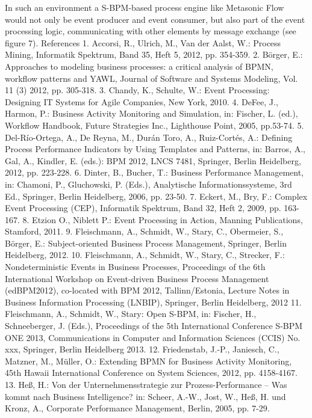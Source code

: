 In such an environment a S-BPM-based process engine like Metasonic Flow would not only be event producer and event consumer, but also part of the event processing logic, communicating with other elements by message exchange (see figure 7).
References
1.	Accorsi, R., Ulrich, M., Van der Aalst, W.: Process Mining, Informatik Spektrum, Band 35, Heft 5, 2012, pp. 354-359.
2.	Börger, E.: Approaches to modeling business processes: a critical analysis of BPMN, workflow patterns and YAWL, Journal of Software and Systems Modeling, Vol. 11 (3) 2012, pp. 305-318.
3.	Chandy, K., Schulte, W.: Event Processing: Designing IT Systems for Agile Companies, New York, 2010.
4.	DeFee, J., Harmon, P.: Business Activity Monitoring and Simulation, in: Fischer, L. (ed.), Workflow Handbook, Future Strategies Inc., Lighthouse Point, 2005, pp.53-74.
5.	Del-Río-Ortega, A., De Reyna, M., Durán Toro, A., Ruiz-Cortés, A.: Defining Process Performance Indicators by Using Templates and Patterns, in: Barros, A., Gal, A., Kindler, E. (eds.): BPM 2012, LNCS 7481, Springer, Berlin Heidelberg, 2012, pp. 223-228.
6.	Dinter, B., Bucher, T.: Business Performance Management, in: Chamoni, P., Gluchowski, P. (Eds.), Analytische Informationssysteme, 3rd Ed., Springer, Berlin Heidelberg, 2006, pp. 23-50.
7.	Eckert, M., Bry, F.: Complex Event Processing (CEP), Informatik Spektrum, Band 32, Heft 2, 2009, pp. 163-167.
8.	Etzion O., Niblett P.: Event Processing in Action, Manning Publications, Stamford, 2011.
9.	Fleischmann, A., Schmidt, W., Stary, C., Obermeier, S., Börger, E.: Subject-oriented Business Process Management, Springer, Berlin Heidelberg, 2012.
10.	Fleischmann, A., Schmidt, W., Stary, C., Strecker, F.: Nondeterministic Events in Business Processes, Proceedings of the 6th International Workshop on Event-driven Business Process Management (edBPM2012), co-located with BPM 2012, Tallinn/Estonia, Lecture Notes in Business Information Processing (LNBIP), Springer, Berlin Heidelberg, 2012
11.	Fleischmann, A., Schmidt, W., Stary: Open S-BPM, in: Fischer, H., Schneeberger, J. (Eds.), Proceedings of the 5th International Conference S-BPM ONE 2013, Communications in Computer and Information Sciences (CCIS) No. xxx, Springer, Berlin Heidelberg 2013.
12.	Friedenstab, J.-P., Janiesch, C., Matzner, M., Müller, O.: Extending BPMN for Business Activity Monitoring, 45th Hawaii International Conference on System Sciences, 2012, pp. 4158-4167.
13.	Heß, H.: Von der Unternehmensstrategie zur Prozess-Performance – Was kommt nach Business Intelligence? in: Scheer, A.-W., Jost, W., Heß, H. und Kronz, A., Corporate Performance Management, Berlin, 2005, pp. 7-29.
